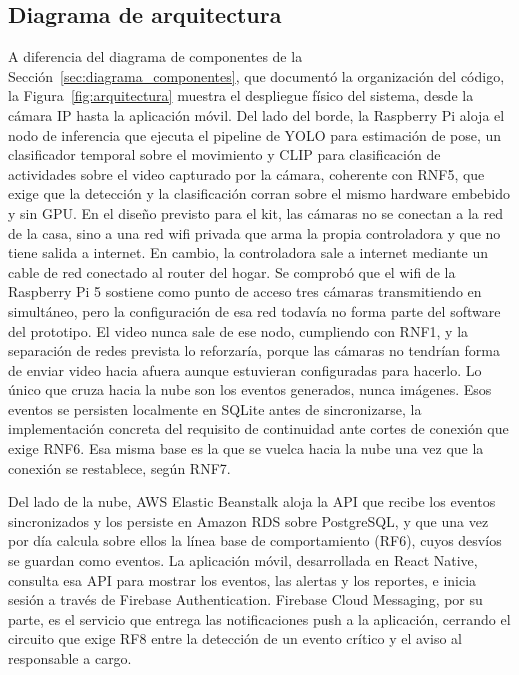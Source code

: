\subsection{Diagrama de arquitectura}
\label{sec:diagrama_arquitectura}

A diferencia del diagrama de componentes de la Sección~\ref{sec:diagrama_componentes}, que documentó la organización del código, la Figura~\ref{fig:arquitectura} muestra el despliegue físico del sistema, desde la cámara IP hasta la aplicación móvil.
Del lado del borde, la Raspberry Pi aloja el nodo de inferencia que ejecuta el pipeline de YOLO para estimación de pose, un clasificador temporal sobre el movimiento y CLIP para clasificación de actividades sobre el video capturado por la cámara, coherente con RNF5, que exige que la detección y la clasificación corran sobre el mismo hardware embebido y sin GPU.
En el diseño previsto para el kit, las cámaras no se conectan a la red de la casa, sino a una red wifi privada que arma la propia controladora y que no tiene salida a internet.
En cambio, la controladora sale a internet mediante un cable de red conectado al router del hogar.
Se comprobó que el wifi de la Raspberry Pi 5 sostiene como punto de acceso tres cámaras transmitiendo en simultáneo, pero la configuración de esa red todavía no forma parte del software del prototipo.
El video nunca sale de ese nodo, cumpliendo con RNF1, y la separación de redes prevista lo reforzaría, porque las cámaras no tendrían forma de enviar video hacia afuera aunque estuvieran configuradas para hacerlo.
Lo único que cruza hacia la nube son los eventos generados, nunca imágenes.
Esos eventos se persisten localmente en SQLite antes de sincronizarse, la implementación concreta del requisito de continuidad ante cortes de conexión que exige RNF6.
Esa misma base es la que se vuelca hacia la nube una vez que la conexión se restablece, según RNF7.

Del lado de la nube, AWS Elastic Beanstalk aloja la API que recibe los eventos sincronizados y los persiste en Amazon RDS sobre PostgreSQL, y que una vez por día calcula sobre ellos la línea base de comportamiento (RF6), cuyos desvíos se guardan como eventos.
La aplicación móvil, desarrollada en React Native, consulta esa API para mostrar los eventos, las alertas y los reportes, e inicia sesión a través de Firebase Authentication.
Firebase Cloud Messaging, por su parte, es el servicio que entrega las notificaciones push a la aplicación, cerrando el circuito que exige RF8 entre la detección de un evento crítico y el aviso al responsable a cargo.

